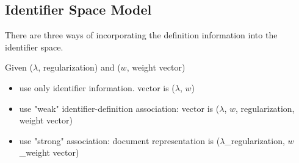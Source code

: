 \subsection{Identifier Space Model}


There are three ways of incorporating the definition information into the identifier space.

Given ($\lambda$, regularization) and ($w$, weight vector)

\begin{itemize}
  \item use only identifier information. vector is ($\lambda$, $w$)
  \item use "weak" identifier-definition association: vector is ($\lambda$, $w$, regularization, weight vector)
  \item use "strong" association: document representation is ($\lambda$\_regularization, $w$\_weight vector)
\end{itemize}
